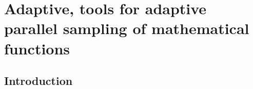 \chapter{Adaptive, tools for adaptive parallel sampling of mathematical functions}
\label{ch:adaptive}

\newpage
\noindent 
\section{Introduction}

\cite{Beenakker1992} %

